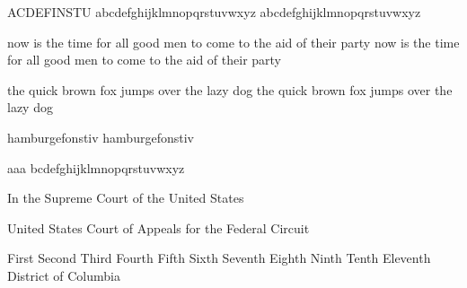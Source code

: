 \documentclass[12pt]{article}
\begin{document}
\Huge
ACDEFINSTU
abcdefghijklmnopqrstuvwxyz
\textsf{abcdefghijklmnopqrstuvwxyz}

now is the time for all good men to come to the aid of their party
\textsf{now is the time for all good men to come to the aid of their party}

the quick brown fox jumps over the lazy dog
\textsf{the quick brown fox jumps over the lazy dog}

hamburgefonstiv
\textsf{hamburgefonstiv}

\def\doletter#1{\ifx#1\relax\else #1\textsf{#1} \expandafter\doletter\fi}

\doletter abcdefghijklmnopqrstuvwxyz\relax

In the Supreme Court of the United States

United States Court of Appeals for the Federal Circuit

First
Second
Third
Fourth
Fifth
Sixth
Seventh
Eighth
Ninth
Tenth
Eleventh
District of Columbia
\end{document}
